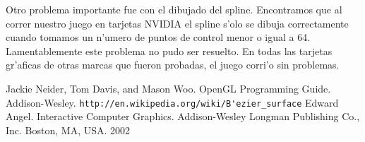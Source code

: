 \documentclass[10pt,letterpaper]{article}
\begin{document}
Otro problema importante fue con el dibujado del spline. Encontramos
que al correr nuestro juego en tarjetas NVIDIA el spline s'olo se
dibuja correctamente cuando tomamos un n'umero de puntos de control
menor o igual a 64. Lamentablemente este problema no pudo ser
resuelto. En todas las tarjetas gr'aficas de otras marcas que fueron
probadas, el juego corri'o sin problemas.

\begin{thebibliography}{99}
 Jackie Neider, Tom Davis, and Mason Woo. OpenGL
  Programming Guide. Addison-Wesley.
 \verb|http://en.wikipedia.org/wiki/B'ezier_surface|
Edward Angel. Interactive Computer Graphics. Addison-Wesley Longman Publishing Co., Inc. Boston, MA, USA. 2002
\end{thebibliography}
\end{document}
